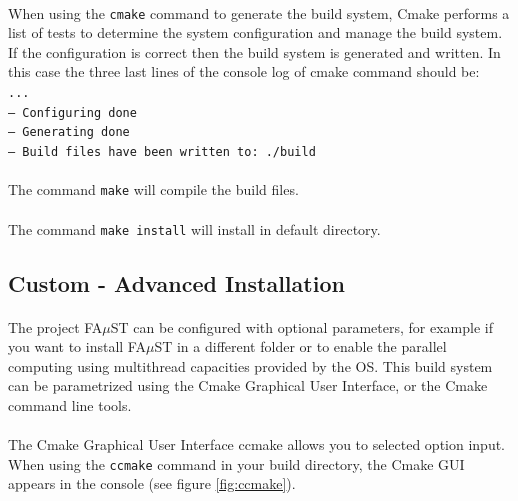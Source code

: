 \paragraph{}When using the \texttt{cmake} command to generate the build system, Cmake performs a list of tests to determine the system configuration and manage the build system. If the configuration is correct then the build system is generated and written. In this case the three last lines of the console log of cmake command should be: \\
\texttt{... \\
-- Configuring done \\
-- Generating done \\
-- Build files have been written to: ./build}

\paragraph{}The command \texttt{make} will compile the build files.

\paragraph{}The command \texttt{make install} will install in default directory.



\subsection{Custom - Advanced Installation}\label{sec:UnixCustomInstall}

\paragraph{}The project FA$\mu$ST can be configured with optional parameters, for example if you want to install FA$\mu$ST in a different folder or to enable the parallel computing using multithread capacities provided by the OS. This build system can be parametrized using the Cmake Graphical User Interface, or the Cmake command line tools. 

\paragraph{}The Cmake Graphical User Interface ccmake allows you to selected option input. When using the \texttt{ccmake} command in your build directory, the Cmake GUI appears in the console (see figure \ref{fig:ccmake}).

